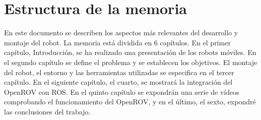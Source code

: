 \section{Estructura de la memoria}
\label{cap:estructuradelamemoria}
En este documento se describen los aspectos más relevantes del desarrollo y montaje del robot. La memoria está dividida en 6 capítulos. 
En el primer capítulo, Introducción, se ha realizado una presentación de los robots móviles. En el segundo capítulo se define el problema y se establecen los objetivos. El montaje del robot, el entorno y las herramientas utilizadas se especifica en el tercer capítulo. En el siguiente capítulo, el cuarto, se mostrará la integración del OpenROV con ROS. En el quinto capítulo se expondrán una serie de vídeos comprobando el funcionamiento del OpenROV, y en el último, el sexto, expondré las conclusiones del trabajo.
